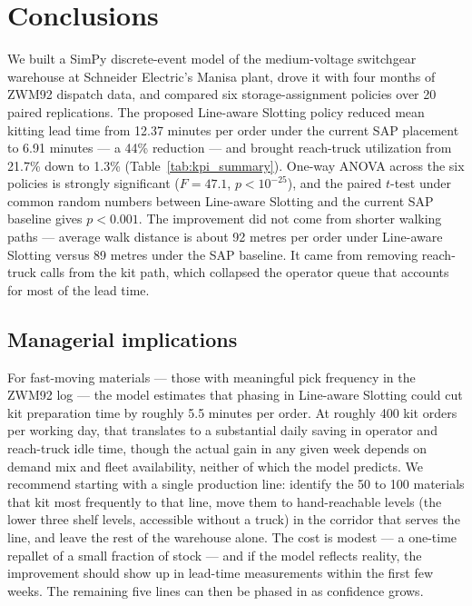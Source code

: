 \section{Conclusions}\label{sec:conclusions}

We built a SimPy discrete-event model of the medium-voltage switchgear
warehouse at Schneider Electric's Manisa plant, drove it with four months of ZWM92
dispatch data, and compared six storage-assignment policies over 20
paired replications. The proposed Line-aware Slotting policy reduced
mean kitting lead time from 12.37 minutes per order under the current
SAP placement to 6.91 minutes --- a 44\% reduction --- and brought
reach-truck utilization from 21.7\% down to 1.3\%
(Table~\ref{tab:kpi_summary}). One-way ANOVA across the six policies is
strongly significant ($F = 47.1$, $p < 10^{-25}$), and the paired
$t$-test under common random numbers between Line-aware Slotting and
the current SAP baseline gives $p < 0.001$. The improvement did
not come from shorter walking paths --- average walk distance is about
92 metres per order under Line-aware Slotting versus 89 metres under the
SAP baseline. It came from removing reach-truck calls from the kit path,
which collapsed the operator queue that accounts for most of the lead
time.

\subsection*{Managerial implications}

For fast-moving materials --- those with meaningful pick frequency in the
ZWM92 log --- the model estimates that phasing in Line-aware Slotting
could cut kit preparation time by roughly 5.5 minutes per order. At
roughly 400 kit orders per working day, that translates to a substantial
daily saving in operator and reach-truck idle time, though the actual
gain in any given week depends on demand mix and fleet availability,
neither of which the model predicts. We recommend starting with a single
production line: identify the 50 to 100 materials that kit most
frequently to that line, move them to hand-reachable levels (the lower
three shelf levels, accessible without a truck) in the corridor that
serves the line, and leave the rest of the warehouse alone. The cost is
modest --- a one-time repallet of a small fraction of stock --- and if
the model reflects reality, the improvement should show up in lead-time
measurements within the first few weeks. The remaining five lines can
then be phased in as confidence grows.

